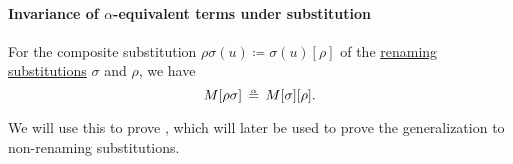\paragraph{Invariance of \( \alpha \)-equivalent terms under substitution}

\begin{lemma}\label{thm:renaming_composition_is_alpha_equivalent}
  For the composite substitution \( \rho\sigma(u) \coloneqq \sigma(u)[\rho] \) of the \hyperref[def:lambda_renaming]{renaming substitutions} \( \sigma \) and \( \rho \), we have
  \begin{equation}\label{eq:thm:renaming_composition_is_alpha_equivalent}
    M[\rho\sigma] \aequiv M[\sigma][\rho].
  \end{equation}
\end{lemma}
\begin{comments}
  \item We will use this to prove , which will later be used to prove the generalization  to non-renaming substitutions.
\end{comments}
